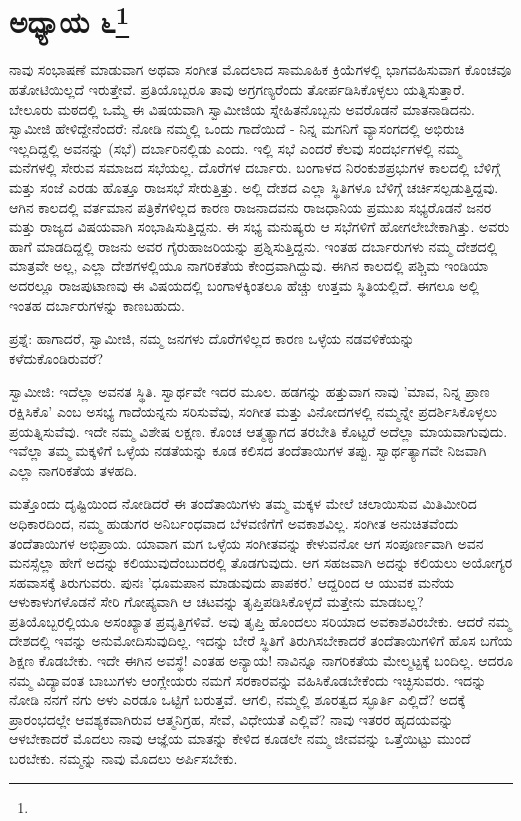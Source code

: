 \newpage

\chapter[ಅಧ್ಯಾಯ ೬]{ಅಧ್ಯಾಯ ೬\protect\footnote{}}

ನಾವು ಸಂಭಾಷಣೆ ಮಾಡುವಾಗ ಅಥವಾ ಸಂಗೀತ ಮೊದಲಾದ ಸಾಮೂಹಿಕ ಕ್ರಿಯೆಗಳಲ್ಲಿ ಭಾಗವಹಿಸುವಾಗ ಕೊಂಚವೂ ಹತೋಟಿಯಿಲ್ಲದೆ ಇರುತ್ತೇವೆ. ಪ್ರತಿಯೊಬ್ಬರೂ ತಾವು ಅಗ್ರಗಣ್ಯರೆಂದು ತೋರ್ಪಡಿಸಿಕೊಳ್ಳಲು ಯತ್ನಿಸುತ್ತಾರೆ. ಬೇಲೂರು ಮಠದಲ್ಲಿ ಒಮ್ಮೆ ಈ ವಿಷಯವಾಗಿ ಸ್ವಾಮೀಜಿಯ ಸ್ನೇಹಿತನೊಬ್ಬನು ಅವರೊಡನೆ ಮಾತನಾಡಿದನು. ಸ್ವಾಮೀಜಿ ಹೇಳಿದ್ದೇನೆಂದರೆ: ನೋಡಿ ನಮ್ಮಲ್ಲಿ ಒಂದು ಗಾದೆಯಿದೆ - ನಿನ್ನ ಮಗನಿಗೆ ವ್ಯಾಸಂಗದಲ್ಲಿ ಅಭಿರುಚಿ ಇಲ್ಲದಿದ್ದಲ್ಲಿ ಅವನನ್ನು (ಸಭೆ) ದರ್ಬಾರಿನಲ್ಲಿಡು ಎಂದು. ಇಲ್ಲಿ ಸಭೆ ಎಂದರೆ ಕೆಲವು ಸಂದರ್ಭಗಳಲ್ಲಿ ನಮ್ಮ ಮನೆಗಳಲ್ಲಿ ಸೇರುವ ಸಮಾಜದ ಸಭೆಯಲ್ಲ. ದೊರೆಗಳ ದರ್ಬಾರು. ಬಂಗಾಳದ ನಿರಂಕುಶಪ್ರಭುಗಳ ಕಾಲದಲ್ಲಿ ಬೆಳಿಗ್ಗೆ ಮತ್ತು ಸಂಜೆ ಎರಡು ಹೊತ್ತೂ ರಾಜಸಭೆ ಸೇರುತ್ತಿತ್ತು. ಅಲ್ಲಿ ದೇಶದ ಎಲ್ಲಾ ಸ್ಥಿತಿಗಳೂ ಬೆಳಿಗ್ಗೆ ಚರ್ಚಿಸಲ್ಪಡುತ್ತಿದ್ದವು. ಆಗಿನ ಕಾಲದಲ್ಲಿ ವರ್ತಮಾನ ಪತ್ರಿಕೆಗಳಿಲ್ಲದ ಕಾರಣ ರಾಜನಾದವನು ರಾಜಧಾನಿಯ ಪ್ರಮುಖ ಸಭ್ಯರೊಡನೆ ಜನರ ಮತ್ತು ರಾಜ್ಯದ ವಿಷಯವಾಗಿ ಸಂಭಾಷಿಸುತ್ತಿದ್ದನು. ಈ ಸಭ್ಯ ಮನುಷ್ಯರು ಆ ಸಭೆಗಳಿಗೆ ಹೋಗಲೇಬೇಕಾಗಿತ್ತು. ಅವರು ಹಾಗೆ ಮಾಡದಿದ್ದಲ್ಲಿ ರಾಜನು ಅವರ ಗೈರುಹಾಜರಿಯನ್ನು ಪ್ರಶ್ನಿಸುತ್ತಿದ್ದನು. ಇಂತಹ ದರ್ಬಾರುಗಳು ನಮ್ಮ ದೇಶದಲ್ಲಿ ಮಾತ್ರವೇ ಅಲ್ಲ, ಎಲ್ಲಾ ದೇಶಗಳಲ್ಲಿಯೂ ನಾಗರಿಕತೆಯ ಕೇಂದ್ರವಾಗಿದ್ದುವು. ಈಗಿನ ಕಾಲದಲ್ಲಿ ಪಶ್ಚಿಮ ಇಂಡಿಯಾ ಅದರಲ್ಲೂ ರಾಜಪುಟಾಣವು ಈ ವಿಷಯದಲ್ಲಿ ಬಂಗಾಳಕ್ಕಿಂತಲೂ ಹೆಚ್ಚು ಉತ್ತಮ ಸ್ಥಿತಿಯಲ್ಲಿದೆ. ಈಗಲೂ ಅಲ್ಲಿ ಇಂತಹ ದರ್ಬಾರುಗಳನ್ನು ಕಾಣಬಹುದು.

ಪ್ರಶ್ನೆ: ಹಾಗಾದರೆ, ಸ್ವಾಮೀಜಿ, ನಮ್ಮ ಜನಗಳು ದೊರೆಗಳಿಲ್ಲದ ಕಾರಣ ಒಳ್ಳೆಯ ನಡವಳಿಕೆಯನ್ನು ಕಳೆದುಕೊಂಡಿರುವರೆ?

ಸ್ವಾಮೀಜಿ: ಇದೆಲ್ಲಾ ಅವನತ ಸ್ಥಿತಿ. ಸ್ವಾರ್ಥವೇ ಇದರ ಮೂಲ. ಹಡಗನ್ನು ಹತ್ತುವಾಗ ನಾವು 'ಮಾವ, ನಿನ್ನ ಪ್ರಾಣ ರಕ್ಷಿಸಿಕೊ' ಎಂಬ ಅಸಭ್ಯ ಗಾದೆಯನ್ನನು ಸರಿಸುವೆವು, ಸಂಗೀತ ಮತ್ತು ವಿನೋದಗಳಲ್ಲಿ ನಮ್ಮನ್ನೇ ಪ್ರದರ್ಶಿಸಿಕೊಳ್ಳಲು ಪ್ರಯತ್ನಿಸುವೆವು. ಇದೇ ನಮ್ಮ ವಿಶೇಷ ಲಕ್ಷಣ. ಕೊಂಚ ಆತ್ಮತ್ಯಾಗದ ತರಬೇತಿ ಕೊಟ್ಟರೆ ಅದೆಲ್ಲಾ ಮಾಯವಾಗುವುದು. ಇವೆಲ್ಲಾ ತಮ್ಮ ಮಕ್ಕಳಿಗೆ ಒಳ್ಳೆಯ ನಡತೆಯನ್ನು ಕೂಡ ಕಲಿಸದ ತಂದೆತಾಯಿಗಳ ತಪ್ಪು. ಸ್ವಾರ್ಥತ್ಯಾಗವೇ ನಿಜವಾಗಿ ಎಲ್ಲಾ ನಾಗರಿಕತೆಯ ತಳಹದಿ.

ಮತ್ತೊಂದು ದೃಷ್ಟಿಯಿಂದ ನೋಡಿದರೆ ಈ ತಂದೆತಾಯಿಗಳು ತಮ್ಮ ಮಕ್ಕಳ ಮೇಲೆ ಚಲಾಯಿಸುವ ಮಿತಿಮೀರಿದ ಅಧಿಕಾರದಿಂದ, ನಮ್ಮ ಹುಡುಗರ ಅನಿರ್ಬಂಧವಾದ ಬೆಳವಣಿಗೆಗೆ ಅವಕಾಶವಿಲ್ಲ. ಸಂಗೀತ ಅನುಚಿತವೆಂದು ತಂದೆತಾಯಿಗಳ ಅಭಿಪ್ರಾಯ. ಯಾವಾಗ ಮಗ ಒಳ್ಳೆಯ ಸಂಗೀತವನ್ನು ಕೇಳುವನೋ ಆಗ ಸಂಪೂರ್ಣವಾಗಿ ಅವನ ಮನಸ್ಸೆಲ್ಲಾ ಹೇಗೆ ಅದನ್ನು ಕಲಿಯುವುದೆಂಬುದರಲ್ಲಿ ತೊಡಗುವುದು. ಆಗ ಸಹಜವಾಗಿ ಅದನ್ನು ಕಲಿಯಲು ಅಯೋಗ್ಯರ ಸಹವಾಸಕ್ಕೆ ತಿರುಗುವರು. ಪುನಃ 'ಧೂಮಪಾನ ಮಾಡುವುದು ಪಾಪಕರ.' ಆದ್ದರಿಂದ ಆ ಯುವಕ ಮನೆಯ ಆಳುಕಾಳುಗಳೊಡನೆ ಸೇರಿ ಗೋಪ್ಯವಾಗಿ ಆ ಚಟವನ್ನು ತೃಪ್ತಿಪಡಿಸಿಕೊಳ್ಳದೆ ಮತ್ತೇನು ಮಾಡಬಲ್ಲ? ಪ್ರತಿಯೊಬ್ಬರಲ್ಲಿಯೂ ಅಸಂಖ್ಯಾತ ಪ್ರವೃತ್ತಿಗಳಿವೆ. ಅವು ತೃಪ್ತಿ ಹೊಂದಲು ಸರಿಯಾದ ಅವಕಾಶವಿರಬೇಕು. ಆದರೆ ನಮ್ಮ ದೇಶದಲ್ಲಿ ಇವನ್ನು ಅನುಮೋದಿಸುವುದಿಲ್ಲ. ಇದನ್ನು ಬೇರೆ ಸ್ಥಿತಿಗೆ ತಿರುಗಿಸಬೇಕಾದರೆ ತಂದೆತಾಯಿಗಳಿಗೆ ಹೊಸ ಬಗೆಯ ಶಿಕ್ಷಣ ಕೊಡಬೇಕು. ಇದೇ ಈಗಿನ ಅವಸ್ಥೆ! ಎಂತಹ ಅನ್ಯಾಯ! ನಾವಿನ್ನೂ ನಾಗರಿಕತೆಯ ಮೇಲ್ಮಟ್ಟಕ್ಕೆ ಬಂದಿಲ್ಲ. ಆದರೂ ನಮ್ಮ ವಿದ್ಯಾವಂತ ಬಾಬುಗಳು ಆಂಗ್ಲೇಯರು ನಮಗೆ ಸರಕಾರವನ್ನು ವಹಿಸಿಕೊಡಬೇಕೆಂದು ಇಚ್ಛಿಸುವರು. ಇದನ್ನು ನೋಡಿ ನನಗೆ ನಗು ಅಳು ಎರಡೂ ಒಟ್ಟಿಗೆ ಬರುತ್ತವೆ. ಆಗಲಿ, ನಮ್ಮಲ್ಲಿ ಶೂರತ್ವದ ಸ್ಫೂರ್ತಿ ಎಲ್ಲಿದೆ? ಅದಕ್ಕೆ ಪ್ರಾರಂಭದಲ್ಲೇ ಆವಶ್ಯಕವಾಗಿರುವ ಆತ್ಮನಿಗ್ರಹ, ಸೇವೆ, ವಿಧೇಯತೆ ಎಲ್ಲಿವೆ? ನಾವು ಇತರರ ಹೃದಯವನ್ನು ಆಳಬೇಕಾದರೆ ಮೊದಲು ನಾವು ಆಜ್ಞೆಯ ಮಾತನ್ನು ಕೇಳಿದ ಕೂಡಲೇ ನಮ್ಮ ಜೀವವನ್ನು ಒತ್ತೆಯಿಟ್ಟು ಮುಂದೆ ಬರಬೇಕು. ನಮ್ಮನ್ನು ನಾವು ಮೊದಲು ಅರ್ಪಿಸಬೇಕು.

